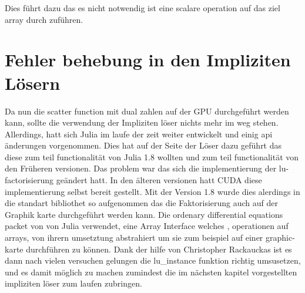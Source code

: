 Dies führt dazu das es nicht notwendig ist eine scalare operation auf das ziel array durch zuführen.


\section{ Fehler behebung in den Impliziten Lösern }


Da nun die scatter function mit dual zahlen auf der GPU durchgeführt werden kann, sollte die verwendung der Impliziten löser nichts mehr im weg stehen.
Allerdings, hatt sich Julia im laufe der zeit weiter entwickelt und einig api änderungen vorgenommen.
Dies hat auf der Seite der Löser dazu geführt das diese zum teil functionalität von Julia 1.8 wollten und zum teil functionalität von den Früheren versionen.
Das problem war das sich die implementierung der lu-factorisierung geändert hatt.
In den älteren versionen hatt CUDA diese implementierung selbst bereit gestellt.
Mit der Version 1.8 wurde dies alerdings in die standart bibliothet so aufgenommen das die Faktorisierung 
auch auf der Graphik karte durchgeführt werden kann.
Die ordenary differential equations packet von von Julia verwendet, 
eine Array Interface welches , operationen auf arrays, 
von ihrern umsetztung abstrahiert um sie zum beispiel auf einer graphic-karte durchführen zu können.
Dank der hilfe von Christopher Rackauckas ist es dann nach vielen versuchen gelungen die lu\_instance funktion richtig umsusetzen, 
und es damit möglich zu machen zumindest die im nächsten kapitel vorgestellten impliziten löser zum laufen zubringen.












